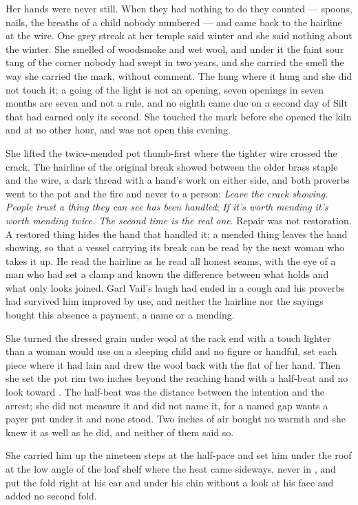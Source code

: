 Her hands were never still. When they had nothing to do they counted --- spoons, nails, the breaths of a child nobody numbered --- and came back to the hairline at the wire. One grey streak at her temple said winter and she said nothing about the winter. She smelled of woodsmoke and wet wool, and under it the faint sour tang of the corner nobody had swept in two years, and she carried the smell the way she carried the mark, without comment. The  hung where it hung and she did not touch it; a going of the light is not an opening, seven openings in seven months are seven and not a rule, and no eighth came due on a second day of Silt that had earned only its second. She touched the mark before she opened the kiln and at no other hour, and  was not open this evening.

She lifted the twice-mended pot thumb-first where the tighter wire crossed the crack. The hairline of the original break showed between the older brass staple and the wire, a dark thread with a hand's work on either side, and both proverbs went to the pot and the fire and never to a person: \emph{Leave the crack showing. People trust a thing they can see has been handled}; \emph{If it's worth mending it's worth mending twice. The second time is the real one}. Repair was not restoration. A restored thing hides the hand that handled it; a mended thing leaves the hand showing, so that a vessel carrying its break can be read by the next woman who takes it up. He read the hairline as he read all honest seams, with the eye of a man who had set a clamp and known the difference between what holds and what only looks joined. Garl Vail's laugh had ended in a cough and his proverbs had survived him improved by use, and neither the hairline nor the sayings bought this absence a payment, a name or a mending.

She turned the dressed grain under wool at the rack end with a touch lighter than a woman would use on a sleeping child and no figure or handful, set each piece where it had lain and drew the wool back with the flat of her hand. Then she set the pot rim two inches beyond the reaching hand with a half-beat and no look toward . The half-beat was the distance between the intention and the arrest; she did not measure it and did not name it, for a named gap wants a payer put under it and none stood. Two inches of air bought no warmth and she knew it as well as he did, and neither of them said so.

She carried him up the nineteen steps at the half-pace and set him under the roof at the low angle of the loaf shelf where the heat came sideways, never in , and put the fold right at his ear and under his chin without a look at his face and added no second fold.

